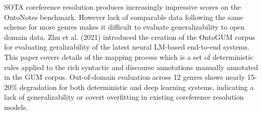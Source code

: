 SOTA coreference resolution produces increasingly impressive scores on the OntoNotes benchmark. However lack of comparable data following the same scheme for more genres makes it difficult to evaluate generalizability to open domain data. Zhu et al. (2021) introduced the creation of the OntoGUM corpus for evaluating geralizability of the latest neural LM-based end-to-end systems.  This paper covers details of the mapping process which is a set of deterministic rules applied to the rich syntactic and discourse annotations manually annotated in the GUM corpus. Out-of-domain evaluation across 12 genres shows nearly 15-20\% degradation for both deterministic and deep learning systems, indicating a lack of generalizability or covert overfitting in existing coreference resolution models.
